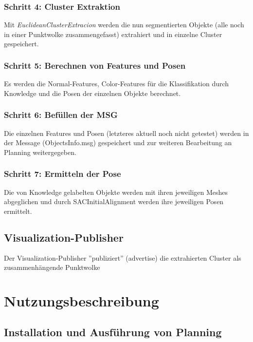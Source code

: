 \documentclass{suturo}
\begin{document}
\subsubsection{Schritt 4: Cluster Extraktion}
Mit \textit{EuclideanClusterExtracion} werden die nun segmentierten Objekte (alle noch in einer Punktwolke zusammengefasst) extrahiert und in einzelne Cluster gespeichert.
\\
\subsubsection{Schritt 5: Berechnen von Features und Posen}
Es werden die Normal-Features, Color-Features für die Klassifikation durch Knowledge und die Posen der einzelnen Objekte berechnet.
 
\subsubsection{Schritt 6: Befüllen der MSG}
Die einzelnen Features und Posen (letzteres aktuell noch nicht getestet) werden in der Message (ObjectsInfo.msg) gespeichert und zur weiteren Bearbeitung an Planning weitergegeben.

\subsubsection{Schritt 7: Ermitteln der Pose}
Die von Knowledge gelabelten Objekte werden mit ihren jeweiligen Meshes abgeglichen und durch SACInitialAlignment werden ihre jeweiligen Posen ermittelt.

\subsection*{Visualization-Publisher}
Der Visualization-Publisher ''publiziert'' (advertise) die extrahierten Cluster als zusammenhängende Punktwolke

\newpage
\section{Nutzungsbeschreibung}

\subsection{Installation und Ausführung von Planning}
\end{document}
